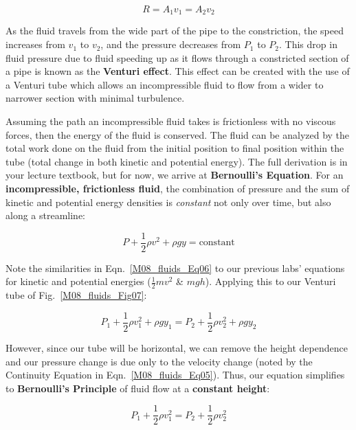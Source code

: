 \begin{equation}
\label{M08_fluids_Eq05}
    R = A_1 v_1 = A_2 v_2
\end{equation}

As the fluid travels from the wide part of the pipe to the constriction, the speed increases from $v_1$ to $v_2$, and the pressure decreases from $P_1$ to $P_2$. This drop in fluid pressure due to fluid speeding up as it flows through a constricted section of a pipe is known as the \textbf{Venturi effect}. This effect can be created with the use of a Venturi tube which allows an incompressible fluid to flow from a wider to narrower section with minimal turbulence.

Assuming the path an incompressible fluid takes is frictionless with no viscous forces, then the energy of the fluid is conserved. The fluid can be analyzed by the total work done on the fluid from the initial position to final position within the tube (total change in both kinetic and potential energy). The full derivation is in your lecture textbook, but for now, we arrive at \textbf{Bernoulli's Equation}. For an \textbf{incompressible, frictionless fluid}, the combination of pressure and the sum of kinetic and potential energy densities is \textit{constant} not only over time, but also along a streamline:

\begin{equation}
\label{M08_fluids_Eq06}
    P + \frac{1}{2}\rho v^2 + \rho g y = \text{constant}
\end{equation}

Note the similarities in Eqn.~\ref{M08_fluids_Eq06} to our previous labs' equations for kinetic and potential energies ($\frac{1}{2}m v^2$ \& $m g h$). Applying this to our Venturi tube of Fig.~\ref{M08_fluids_Fig07}:

\begin{equation}
\label{M08_fluids_Eq07}
    P_1 + \frac{1}{2}\rho v_{1}^2 + \rho g y_1 = P_2 + \frac{1}{2}\rho v_{2}^2 + \rho g y_2
\end{equation}

However, since our tube will be horizontal, we can remove the height dependence and our pressure change is due only to the velocity change (noted by the Continuity Equation in Eqn.~\ref{M08_fluids_Eq05}). Thus, our equation simplifies to \textbf{Bernoulli's Principle} of fluid flow at a \textbf{constant height}:

\begin{equation}
\label{M08_fluids_Eq08}
    P_1 + \frac{1}{2}\rho v_{1}^2 = P_2 + \frac{1}{2}\rho v_{2}^2
\end{equation}


